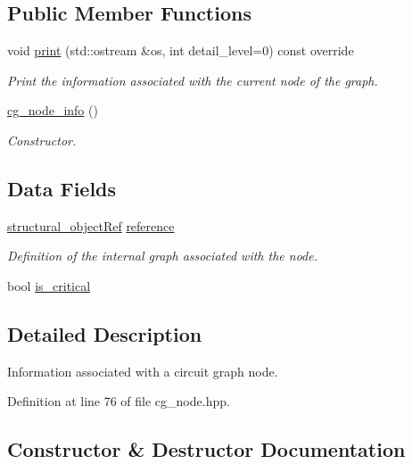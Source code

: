 \subsection*{Public Member Functions}
\begin{DoxyCompactItemize}
\item 
void \hyperlink{structcg__node__info_a010ce271e49a819e639abc65ec0cbdcc}{print} (std\+::ostream \&os, int detail\+\_\+level=0) const override
\begin{DoxyCompactList}\small\item\em Print the information associated with the current node of the graph. \end{DoxyCompactList}\item 
\hyperlink{structcg__node__info_a35e113c41318196003286ab117604cad}{cg\+\_\+node\+\_\+info} ()
\begin{DoxyCompactList}\small\item\em Constructor. \end{DoxyCompactList}\end{DoxyCompactItemize}
\subsection*{Data Fields}
\begin{DoxyCompactItemize}
\item 
\hyperlink{structural__objects_8hpp_a8ea5f8cc50ab8f4c31e2751074ff60b2}{structural\+\_\+object\+Ref} \hyperlink{structcg__node__info_a539bc087cb00cfeefd4d6d1829af12db}{reference}
\begin{DoxyCompactList}\small\item\em Definition of the internal graph associated with the node. \end{DoxyCompactList}\item 
bool \hyperlink{structcg__node__info_a2216c06cfbe94974c1072139e5e97e83}{is\+\_\+critical}
\end{DoxyCompactItemize}


\subsection{Detailed Description}
Information associated with a circuit graph node. 

Definition at line 76 of file cg\+\_\+node.\+hpp.



\subsection{Constructor \& Destructor Documentation}
\mbox{\label{structcg__node__info_a35e113c41318196003286ab117604cad}} 
